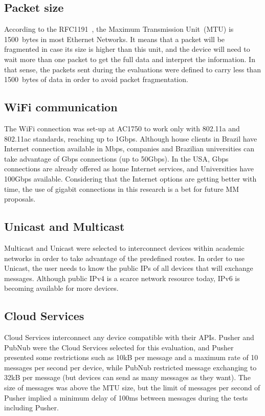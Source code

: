 \subsection*{Packet size}

According to the RFC1191~\citep{RFC1191MTU}, the Maximum Transmission Unit~(MTU) is 1500~bytes in most Ethernet Networks.
It means that a packet will be fragmented in case its size is higher than this unit, and the device will need to wait more than one packet to get the full data and interpret the information.
In that sense, the packets sent during the evaluations were defined to carry less than 1500~bytes of data in order to avoid packet fragmentation.

\subsection*{WiFi communication}

The WiFi connection was set-up at AC1750 to work only with 802.11a and 802.11ac standards, reaching up to 1Gbps.
Although house clients in Brazil have Internet connection available in Mbps, companies and Brazilian universities can take advantage of Gbps connections (up to 50Gbps).
In the USA, Gbps connections are already offered as home Internet services, and Universities have 100Gbps available.
Considering that the Internet options are getting better with time, the use of gigabit connections in this research is a bet for future MM proposals.

\subsection*{Unicast and Multicast}

Multicast and Unicast were selected to interconnect devices within academic networks in order to take advantage of the predefined routes.
In order to use Unicast, the user needs to know the public IPs of all devices that will exchange messages.
Although public IPv4 is a scarce network resource today, IPv6 is becoming available for more devices.

\subsection*{Cloud Services}

Cloud Services interconnect any device compatible with their APIs.
Pusher and PubNub were the Cloud Services selected for this evaluation, and Pusher presented some restrictions such as 10kB per message and a maximum rate of 10 messages per second per device, while PubNub restricted message exchanging to 32kB per message (but devices can send as many messages as they want).
The size of messages was above the MTU size, but the limit of messages per second of Pusher implied a minimum delay of 100ms between messages during the tests including Pusher.

